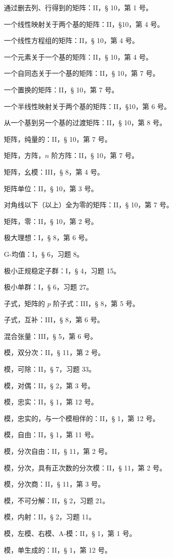 通过删去列、行得到的矩阵：II，§ 10，第 1 号。

一个线性映射关于两个基的矩阵：II，§10，第 4 号。

一个线性方程组的矩阵：II，§ 10，第 4 号。

一个元素关于一个基的矩阵：II，§ 10，第 4 号。

一个自同态关于一个基的矩阵：II，§ 10，第 7 号。

一个置换的矩阵：II，§ 10，第 7 号。

一个半线性映射关于两个基的矩阵：II，§10，第 6 号。

从一个基到另一个基的过渡矩阵：II，§ 10，第 8 号。

矩阵，纯量的：II，§ 10，第 7 号。

矩阵，方阵，\(n\) 阶方阵：II，§ 10，第 7 号。

矩阵，幺模：III，§ 8，第 4 号。

矩阵单位：II，§ 10，第 3 号。

对角线以下（以上）全为零的矩阵：II，§ 10，第 7 号。

矩阵，零：II，§ 10，第 2 号。

极大理想：I，§ 8，第 6 号。

G-均值：I，§ 6，习题 8。

极小正规稳定子群：I，§ 4，习题 15。

极小单群：I，§ 6，习题 27。

子式，矩阵的 \(p\) 阶子式：III，§ 8，第 5 号。

子式，互补：III，§ 8，第 6 号。

混合张量：III，§ 5，第 6 号。

模，双分次：II，§ 11，第 2 号。

模，可除：II，§ 7，习题 33。

模，对偶：II，§ 2，第 3 号。

模，忠实：II，§ 1，第 12 号。

模，忠实的，与一个模相伴的：II，§ 1，第 12 号。

模，自由：II，§ 1，第 11 号。

模，分次自由：II，§ 11，第 2 号。

模，分次，具有正次数的分次模：II，§ 11，第 2 号。

模，分次商：II，§ 11，第 3 号。

模，不可分解：II，§ 2，习题 21。

模，内射：II，§ 2，习题 11。

模，左模、右模、A-模：II，§ 1，第 1 号。

模，单生成的：II，§ 1，第 12 号。

